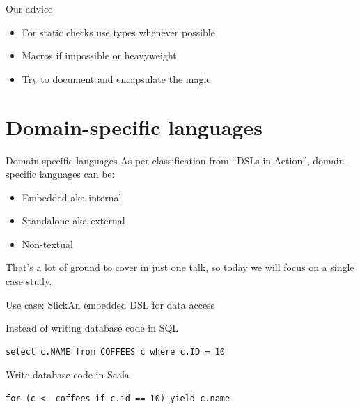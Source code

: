 \documentclass{beamer}
\begin{document}

\begin{frame}{Our advice}
  \begin{itemize}
  \item For static checks use types whenever possible
  \item Macros if impossible or heavyweight
  \item Try to document and encapsulate the magic
  \end{itemize}
\end{frame}

  \section{Domain-specific languages}

\begin{frame}{Domain-specific languages}
  As per classification from ``DSLs in Action'', domain-specific languages can be:

  \vspace{1em}
  \begin{itemize}
  \item Embedded aka internal
  \item Standalone aka external
  \item Non-textual
  \end{itemize}

  \vspace{1em}
  That's a lot of ground to cover in just one talk, so today we will focus on a single case study.
\end{frame}

\begin{frame}[fragile]{Use case: Slick}{An embedded DSL for data access}
  \vspace{1em}
  \begin{alertblock}{Instead of writing database code in SQL}
    \begin{verbatim}
select c.NAME from COFFEES c where c.ID = 10
    \end{verbatim}
  \end{alertblock}

  \vspace{1em}
  \begin{exampleblock}{Write database code in Scala}
    \begin{verbatim}
for (c <- coffees if c.id == 10) yield c.name
    \end{verbatim}
  \end{exampleblock}
\end{frame}
\end{document}

